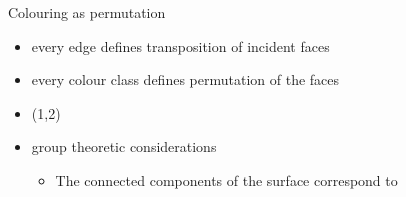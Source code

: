 \begin{frame}{Colouring as permutation}
{        \begin{itemize}
            \item<8->[$\leadsto$] every edge defines transposition of incident faces
            \item<11->[$\leadsto$] every colour class defines permutation of the faces
            \item<9-> \textcolor{\colB}{(1,2)}
            \item<14->[$\leadsto$] group theoretic considerations
                \begin{itemize}
                    \item<15-> The connected components of the surface correspond to 
                \end{itemize}
        \end{itemize}
    }
\end{frame}
         

